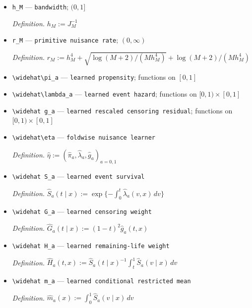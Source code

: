 \documentclass{article}
\begin{document}
\begin{itemize}
  \item \texttt{h\_\allowbreak{}M} --- \texttt{bandwidth}; \((0,1]\)
  \par\smallskip\noindent\emph{Definition.} \(h_M:=J_M^{-1}\)
  \item \texttt{r\_\allowbreak{}M} --- \texttt{primitive nuisance rate}; \((0,\infty)\)
  \par\smallskip\noindent\emph{Definition.} \(r_M:=h_M^4+\sqrt{\log(M+2)/(Mh_M^4)}+\log(M+2)/(Mh_M^4)\)
  \item \texttt{\textbackslash{}\allowbreak{}widehat\textbackslash{}\allowbreak{}pi\_\allowbreak{}a} --- \texttt{learned propensity}; functions on \([0,1]\)
  \item \texttt{\textbackslash{}\allowbreak{}widehat\textbackslash{}\allowbreak{}lambda\_\allowbreak{}a} --- \texttt{learned event hazard}; functions on \([0,1)\times[0,1]\)
  \item \texttt{\textbackslash{}\allowbreak{}widehat g\_\allowbreak{}a} --- \texttt{learned rescaled censoring residual}; functions on \([0,1)\times[0,1]\)
  \item \texttt{\textbackslash{}\allowbreak{}widehat\textbackslash{}\allowbreak{}eta} --- \texttt{foldwise nuisance learner}
  \par\smallskip\noindent\emph{Definition.} \(\widehat\eta:=(\widehat\pi_a,\widehat\lambda_a,\widehat g_a)_{a=0,1}\)
  \item \texttt{\textbackslash{}\allowbreak{}widehat S\_\allowbreak{}a} --- \texttt{learned event survival}
  \par\smallskip\noindent\emph{Definition.} \(\widehat S_a(t\mid x):=\exp\{-\int_0^t\widehat\lambda_a(v,x)\,dv\}\)
  \item \texttt{\textbackslash{}\allowbreak{}widehat G\_\allowbreak{}a} --- \texttt{learned censoring weight}
  \par\smallskip\noindent\emph{Definition.} \(\widehat G_a(t\mid x):=(1-t)^2\widehat g_a(t,x)\)
  \item \texttt{\textbackslash{}\allowbreak{}widehat H\_\allowbreak{}a} --- \texttt{learned remaining-\allowbreak{}life weight}
  \par\smallskip\noindent\emph{Definition.} \(\widehat H_a(t,x):=\widehat S_a(t\mid x)^{-1}\int_t^1\widehat S_a(v\mid x)\,dv\)
  \item \texttt{\textbackslash{}\allowbreak{}widehat m\_\allowbreak{}a} --- \texttt{learned conditional restricted mean}
  \par\smallskip\noindent\emph{Definition.} \(\widehat m_a(x):=\int_0^1\widehat S_a(v\mid x)\,dv\)

\end{itemize}
\end{document}
